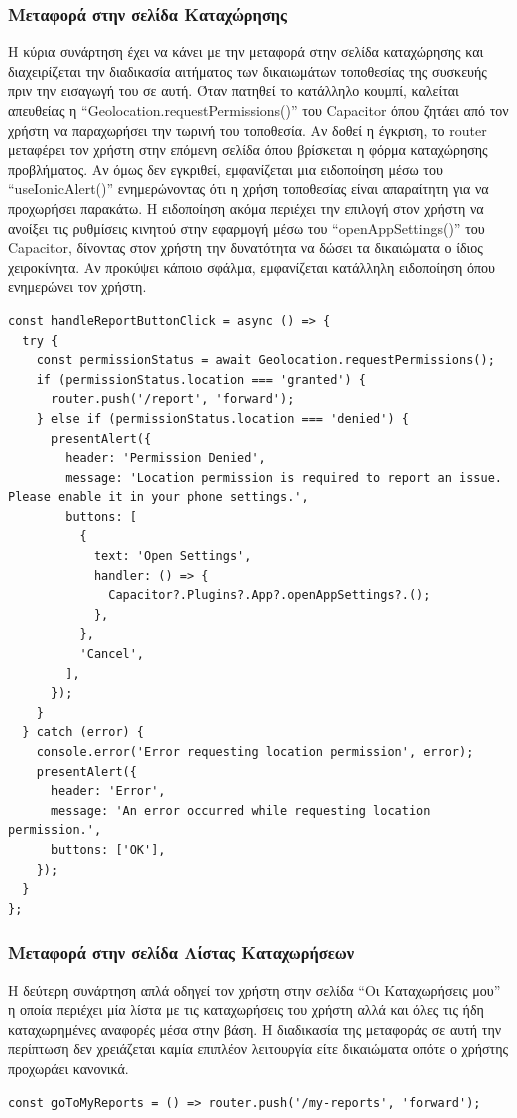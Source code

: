 \subsubsection*{Μεταφορά στην σελίδα Καταχώρησης}
Η κύρια συνάρτηση έχει να κάνει με την μεταφορά στην σελίδα καταχώρησης και διαχειρίζεται την διαδικασία αιτήματος των δικαιωμάτων τοποθεσίας της συσκευής πριν την εισαγωγή του σε αυτή. Όταν πατηθεί το κατάλληλο κουμπί, καλείται απευθείας η “Geolocation.requestPermissions()” του Capacitor όπου ζητάει από τον χρήστη να παραχωρήσει την τωρινή του τοποθεσία. Αν δοθεί η έγκριση, το router μεταφέρει τον χρήστη στην επόμενη σελίδα όπου βρίσκεται η φόρμα καταχώρησης προβλήματος. Αν όμως δεν εγκριθεί, εμφανίζεται μια ειδοποίηση μέσω του “useIonicAlert()” ενημερώνοντας ότι η χρήση τοποθεσίας είναι απαραίτητη για να προχωρήσει παρακάτω. Η ειδοποίηση ακόμα περιέχει την επιλογή στον χρήστη να ανοίξει τις ρυθμίσεις κινητού στην εφαρμογή μέσω του “openAppSettings()” του Capacitor, δίνοντας στον χρήστη την δυνατότητα να δώσει τα δικαιώματα ο ίδιος χειροκίνητα. Αν προκύψει κάποιο σφάλμα, εμφανίζεται κατάλληλη ειδοποίηση όπου ενημερώνει τον χρήστη. 
\\
\begin{lstlisting}
const handleReportButtonClick = async () => {
  try {
    const permissionStatus = await Geolocation.requestPermissions();
    if (permissionStatus.location === 'granted') {
      router.push('/report', 'forward');
    } else if (permissionStatus.location === 'denied') {
      presentAlert({
        header: 'Permission Denied',
        message: 'Location permission is required to report an issue. Please enable it in your phone settings.',
        buttons: [
          {
            text: 'Open Settings',
            handler: () => {
              Capacitor?.Plugins?.App?.openAppSettings?.();
            },
          },
          'Cancel',
        ],
      });
    }
  } catch (error) {
    console.error('Error requesting location permission', error);
    presentAlert({
      header: 'Error',
      message: 'An error occurred while requesting location permission.',
      buttons: ['OK'],
    });
  }
};
\end{lstlisting}

\subsubsection*{Μεταφορά στην σελίδα Λίστας Καταχωρήσεων}
Η δεύτερη συνάρτηση απλά οδηγεί τον χρήστη στην σελίδα “Οι Καταχωρήσεις μου” η οποία περιέχει μία λίστα με τις καταχωρήσεις του χρήστη αλλά και όλες τις ήδη καταχωρημένες αναφορές μέσα στην βάση. Η διαδικασία της μεταφοράς σε αυτή την περίπτωση δεν χρειάζεται καμία επιπλέον λειτουργία είτε δικαιώματα οπότε ο χρήστης προχωράει κανονικά. 
\\
\begin{lstlisting}
const goToMyReports = () => router.push('/my-reports', 'forward');
\end{lstlisting}

